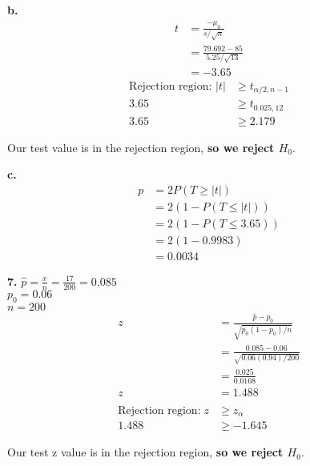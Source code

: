 \documentclass[12pt]{report}
\makeatletter
\newcommand*{\xbar}{}%
\DeclareRobustCommand*{\xbar}{%
	\mathpalette\@xbar{}%
}
\newcommand*{\@xbar}[2]{%
	\sbox0{$#1\mathrm{x}\m@th$}%
	\sbox2{$#1x\m@th$}%
	\rlap{%
		\hbox to\wd2{%
			\hfill
			$\overline{%
				\vrule width 0pt height\ht0 %
				\kern\wd0 %
			}$%
		}%
	}%
	\copy2 %
}
\makeatother
\begin{document}
\noindent \textbf{b.} 
\begin{align*}
	t &= \frac{\xbar - \mu_0}{s/\sqrt{n}}\\
	&= \frac{79.692 - 85}{5.25/\sqrt{13}}\\
	&= -3.65
\end{align*}
\begin{align*}
	\text{Rejection region: } |t| &\geq t_{\alpha/2,n-1}\\
	3.65 &\geq t_{0.025, 12}\\
	3.65 &\geq 2.179
\end{align*}

\noindent Our test value is in the rejection region, \textbf{so we reject $H_0$}.

\noindent \textbf{c.}
\begin{align*}
	p &= 2P(T \geq |t|)\\
	&= 2(1 - P(T \leq |t|))\\
	&= 2(1 - P(T \leq 3.65))\\
	&= 2(1 - 0.9983)\\
	&= \boxed{0.0034}
\end{align*}

\pagebreak
\noindent \textbf{7.} $\hat{p} = \frac{x}{n} = \frac{17}{200} = 0.085$\\
$p_0 = 0.06$\\
$n = 200$
\begin{align*}
	z &= \frac{\hat{p} - p_0}{\sqrt{p_0(1-p_0)/n}}\\
	&= \frac{0.085 - 0.06}{\sqrt{0.06(0.94)/200}}\\
	&= \frac{0.025}{0.0168}\\
	z &= 1.488\\\\
	\text{Rejection region:}\; z &\geq z_{\alpha}\\
	1.488 &\geq -1.645
\end{align*}

\noindent Our test z value is in the rejection region, \textbf{so we reject $H_0$}.
\end{document}
